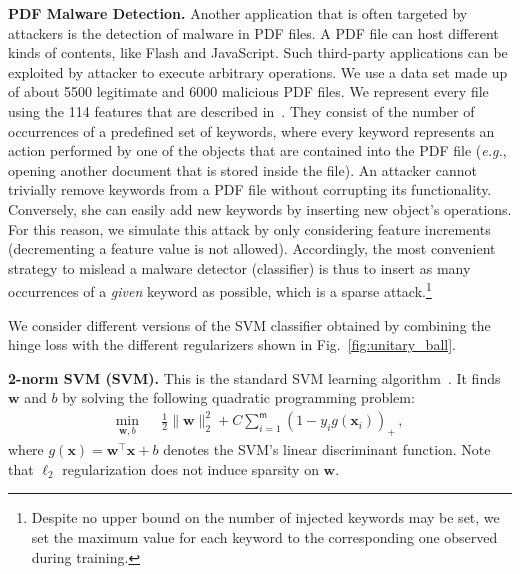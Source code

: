 \documentclass[runningheads,a4paper]{llncs}
\newcommand{\eg}{\emph{e.g.}}
\newcommand{\vct}[1]{\ensuremath{\boldsymbol{#1}}}
\newcommand{\con}[1]{\ensuremath{\mathsf{#1}}}
\newcommand{\T}{\ensuremath{\top}}
\newcommand{\myparagraph}[1]{\smallskip \noindent \textbf{#1.}}
\begin{document}
\myparagraph{PDF Malware Detection}
Another application that is often targeted by attackers is the detection of malware in PDF files.
A PDF file can host different kinds of contents, like Flash and JavaScript. Such third-party applications can be exploited by attacker to execute arbitrary operations.
We use a data set made up of about 5500 legitimate and 6000 malicious PDF files. We represent every file using the 114 features that are described in~\cite{maiorca12-mldm}. They consist of the number of occurrences of a predefined set of keywords, where every keyword represents an action performed by one of the objects that are contained into the PDF file (\eg, opening another document that is stored inside the file).
An attacker cannot trivially remove keywords from a PDF file without corrupting its functionality. 
Conversely, she can easily add new keywords by inserting new object's operations. For this reason, we simulate this attack by only considering feature increments (decrementing a feature value is not allowed). Accordingly, the most convenient strategy to mislead a malware detector (classifier) is thus to insert as many occurrences of a \emph{given} keyword as possible, which is a sparse attack.\footnote{Despite no upper bound on the number of injected keywords may be set, we set the maximum value for each keyword to the corresponding one observed during training.}


\begin{figure*}[t]%
    \centering
    \caption{Unit balls for different norms.}
    \label{fig:unitary_ball}
\end{figure*}


We consider different versions of the SVM classifier obtained by combining the hinge loss with the different regularizers shown in Fig.~\ref{fig:unitary_ball}.

\myparagraph{2-norm SVM (SVM)} This is the standard SVM learning algorithm~\cite{vapnik95}. It finds $\vct w$ and $b$ by solving the following quadratic programming problem:
%
\begin{eqnarray}
 \min_{\vct w,b} && \frac{1}{2}\| \vct w \|^{2}_{2} + C \sum_{i=1}^{\con m} \left( 1 - y_{i} g(\vct x_{i}) \right)_{+} \, ,
\end{eqnarray}
where $g(\vct x)=\vct w^{\T} \vct x + b$ denotes the SVM's linear discriminant function.
Note that $\ell_2$ regularization does not induce sparsity on $\vct w$.
\end{document}
